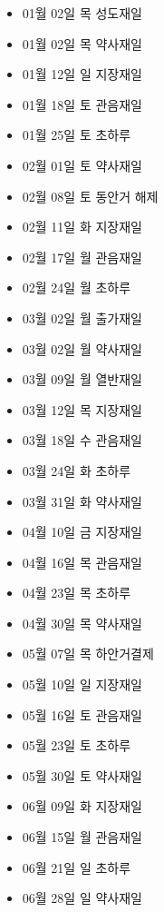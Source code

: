 \documentclass[12pt, a4paper, oneside]{book}
\begin{document}
			\begin{itemize}	[
						topsep=0.0em, 
						parsep=0.0em, 
						itemsep=0em, 
						leftmargin=6.0em, 
						labelwidth=3em, 
						labelsep=3em
						] 
			\item 01월 02일 목 성도재일
			\item 01월 02일 목 약사재일
			\item 01월 12일 일 지장재일
			\item 01월 18일 토 관음재일
			\item 01월 25일 토 초하루

			\item 02월 01일 토 약사재일
			\item 02월 08일 토 동안거 해제
			\item 02월 11일 화 지장재일
			\item 02월 17일 월 관음재일
			\item 02월 24일 월 초하루

			\item 03월 02일 월 출가재일
			\item 03월 02일 월 약사재일
			\item 03월 09일 월 열반재일
			\item 03월 12일 목 지장재일
			\item 03월 18일 수 관음재일
			\item 03월 24일 화 초하루
			\item 03월 31일 화 약사재일


			\item 04월 10일 금 지장재일
			\item 04월 16일 목 관음재일
			\item 04월 23일 목 초하루
			\item 04월 30일 목 약사재일

			\item 05월 07일 목 하안거결제

			\item 05월 10일 일 지장재일
			\item 05월 16일 토 관음재일
			\item 05월 23일 토 초하루
			\item 05월 30일 토 약사재일

			\item 06월 09일 화 지장재일
			\item 06월 15일 월 관음재일
			\item 06월 21일 일 초하루
			\item 06월 28일 일 약사재일


\end{itemize}
\end{document}
